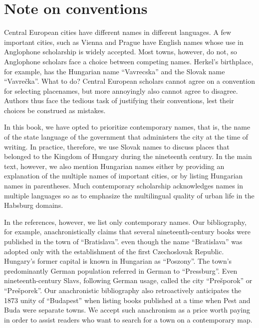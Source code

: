 \chapter{Note on conventions}

Central European cities have different names in different languages. A few important cities, such as Vienna and Prague have English names whose use in Anglophone scholarship is widely accepted. Most towns, however, do not, so Anglophone scholars face a choice between competing names. Herkel’s birthplace, for example, has the Hungarian name “Vavrecska” and the Slovak name “Vavrečka”. What to do? Central European scholars cannot agree on a convention for selecting placenames, but more annoyingly also cannot agree to disagree. Authors thus face the tedious task of justifying their conventions, lest their choices be construed as mistakes.

In this book, we have opted to prioritize contemporary names, that is, the name of the state language of the government that administers the city at the time of writing. In practice, therefore, we use Slovak names to discuss places that belonged to the Kingdom of Hungary during the nineteenth century. In the main text, however, we also mention Hungarian names either by providing an explanation of the multiple names of important cities, or by listing Hungarian names in parentheses. Much contemporary scholarship acknowledges names in multiple languages so as to emphasize the multilingual quality of urban life in the Habsburg domains.

In the references, however, we list only contemporary names. Our bibliography, for example, anachronistically claims that several nineteenth-century books were published in the town of “Bratislava”. even though the name “Bratislava” was adopted only with the establishment of the first Czechoslovak Republic. Hungary’s former capital is known in Hungarian as “Poszony”. The town’s predominantly German population referred in German to “Pressburg”. Even nineteenth-century Slavs, following German usage, called the city “Prešporok” or “Prešporek”. Our anachronistic bibliography also retroactively anticipates the 1873 unity of “Budapest” when listing books published at a time when Pest and Buda were separate towns. We accept such anachronism as a price worth paying in order to assist readers who want to search for a town on a contemporary map.